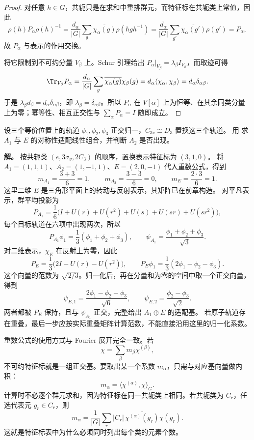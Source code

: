 \begin{proof}
对任意 $h\in G$，共轭只是在求和中重排群元，而特征标在共轭类上常值，因此
\[
\rho(h)P_\alpha\rho(h)^{-1}=\frac{d_\alpha}{|G|}\sum_g\overline{\chi_\alpha(g)}\rho(hgh^{-1})
=\frac{d_\alpha}{|G|}\sum_{g'}\overline{\chi_\alpha(g')}\rho(g')
=P_\alpha,
\]
故 $P_\alpha$ 与表示的作用交换。

将它限制到不可约分量 $V_\beta$ 上。Schur 引理给出
$P_\alpha|_{V_\beta}=\lambda_\beta I_{V_\beta}$，而取迹可得
\[
\Tr_{V_\beta}P_\alpha=\frac{d_\alpha}{|G|}\sum_g\overline{\chi_\alpha(g)}\chi_\beta(g)=d_\alpha\langle\chi_\alpha,\chi_\beta\rangle=d_\alpha\delta_{\alpha\beta}.
\]
于是 $\lambda_\beta d_\beta=d_\alpha\delta_{\alpha\beta}$，即
$\lambda_\beta=\delta_{\alpha\beta}$。所以 $P_\alpha$ 在 $V[\alpha]$ 上为恒等、在其余同类分量上为零；幂等性、相互正交性与 $\sum_\alpha P_\alpha=I$ 随即成立。
\end{proof}

\begin{example}[投影算符在对称性适配线性组合构造中的应用]
\label{ex:projection-salc}
设三个等价位置上的轨道 $\phi_1,\phi_2,\phi_3$ 正交归一，$C_{3v}\cong D_3$ 置换这三个轨道。
用 求 $A_1$ 与 $E$ 的对称性适配线性组合，并判断 $A_2$ 是否出现。

\textbf{解。} 按共轭类 $(e,3\sigma_v,2C_3)$ 的顺序，置换表示特征标为 $(3,1,0)$。
将 $A_1=(1,1,1)$、$A_2=(1,-1,1)$、$E=(2,0,-1)$ 代入重数公式，得到
\[
m_{A_1}=\frac{3+3}6=1,\qquad
m_{A_2}=\frac{3-3}6=0,\qquad
m_E=\frac{2\cdot3}6=1.
\]
这里二维 $E$ 是三角形平面上的转动与反射表示，其矩阵已在前章构造。
对平凡表示，群平均投影为
\[
P_{A_1}=\frac16\bigl(I+U(r)+U(r^2)+U(s)+U(sr)+U(sr^2)\bigr),
\]
每个目标轨道在六项中出现两次，所以
\[
P_{A_1}\phi_1=\frac13(\phi_1+\phi_2+\phi_3),\qquad
\psi_{A_1}=\frac{\phi_1+\phi_2+\phi_3}{\sqrt3}.
\]
对二维表示，$\chi_E$ 在反射上为零，因此
\[
P_E=\frac13\bigl(2I-U(r)-U(r^2)\bigr),\qquad
P_E\phi_1=\frac13(2\phi_1-\phi_2-\phi_3).
\]
这个向量的范数为 $\sqrt{2/3}$。归一化后，再在分量和为零的空间中取一个正交向量，得到
\[
\psi_{E,1}=\frac{2\phi_1-\phi_2-\phi_3}{\sqrt6},\qquad
\psi_{E,2}=\frac{\phi_2-\phi_3}{\sqrt2}.
\]
两者都被 $P_E$ 保持，且与 $\psi_{A_1}$ 正交，完整给出 $A_1\oplus E$ 的适配基。
若原子轨道存在重叠，最后一步应按实际重叠矩阵计算范数，不能直接沿用这里的归一化系数。
\end{example}


重数公式的使用方式与 Fourier 展开完全一致。若
\[
\chi=\sum_\beta m_\beta\chi^{(\beta)},
\]
不可约特征标就是一组正交基。要取出某一个系数 $m_\alpha$，只需与对应基向量做内积：
\[
m_\alpha=\langle\chi^{(\alpha)},\chi\rangle_G.
\]
计算时不必逐个群元求和，因为特征标在同一共轭类上相同。若共轭类为 $C_r$，任选代表元 $g_r\in C_r$，则
\[
m_\alpha=\frac1{|G|}\sum_r |C_r|\,\overline{\chi^{(\alpha)}(g_r)}\chi(g_r).
\]
这就是特征标表中为什么必须同时列出每个类的元素个数。

